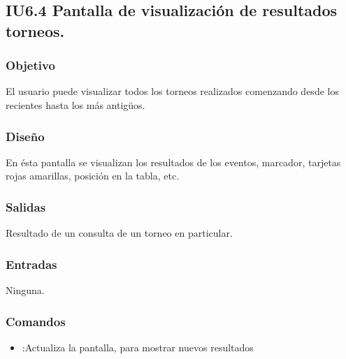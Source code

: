 
\subsection{IU6.4 Pantalla de visualización de resultados torneos.}

\subsubsection{Objetivo}
	El usuario puede visualizar todos los torneos realizados comenzando desde los recientes hasta los más antigüos.

\subsubsection{Diseño}
En ésta pantalla se visualizan los resultados de los eventos, marcador, tarjetas rojas  amarillas, posición en la tabla, etc.
 

\subsubsection{Salidas}

	Resultado de un consulta de un torneo en particular.

\subsubsection{Entradas}
	Ninguna.

\subsubsection{Comandos}
\begin{itemize}
	\item {}:Actualiza la pantalla, para mostrar nuevos resultados
\end{itemize}

